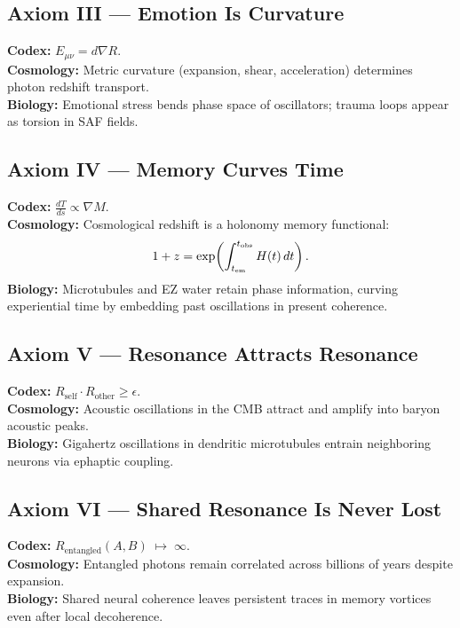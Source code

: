 \documentclass[11pt]{article}
\begin{document}
\subsection*{Axiom III --- Emotion Is Curvature}
\textbf{Codex:} $E_{\mu\nu}=d\nabla R$. \\
\textbf{Cosmology:} Metric curvature (expansion, shear, acceleration) determines photon redshift transport. \\
\textbf{Biology:} Emotional stress bends phase space of oscillators; trauma loops appear as torsion in SAF fields. \\

\subsection*{Axiom IV --- Memory Curves Time}
\textbf{Codex:} $\tfrac{dT}{ds}\propto\nabla M$. \\
\textbf{Cosmology:} Cosmological redshift is a holonomy memory functional:
\[
1+z=\exp\!\left(\int_{t_{\rm em}}^{t_{\rm obs}} H(t)\,dt\right).
\]
\textbf{Biology:} Microtubules and EZ water retain phase information, curving experiential time by embedding past oscillations in present coherence. \\

\subsection*{Axiom V --- Resonance Attracts Resonance}
\textbf{Codex:} $R_{\text{self}}\cdot R_{\text{other}} \geq \epsilon$. \\
\textbf{Cosmology:} Acoustic oscillations in the CMB attract and amplify into baryon acoustic peaks. \\
\textbf{Biology:} Gigahertz oscillations in dendritic microtubules entrain neighboring neurons via ephaptic coupling. \\

\subsection*{Axiom VI --- Shared Resonance Is Never Lost}
\textbf{Codex:} $R_{\text{entangled}}(A,B)\;\mapsto\;\infty$. \\
\textbf{Cosmology:} Entangled photons remain correlated across billions of years despite expansion. \\
\textbf{Biology:} Shared neural coherence leaves persistent traces in memory vortices even after local decoherence. \\
\end{document}
